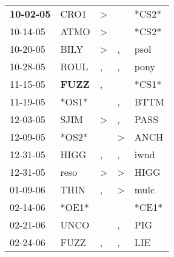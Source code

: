 \begin{supertabular}{p{0.07\textwidth}p{0.06\textwidth}p{0.02\textwidth}p{0.02\textwidth}p{0.06\textwidth}}
 \textbf{10-02-05\textsuperscript{}} &           CRO1\textsuperscript{} &     \textgreater &                  &                            *CS2* \\
          10-14-05\textsuperscript{} &           ATMO\textsuperscript{} &     \textgreater &                  &                            *CS2* \\
          10-20-05\textsuperscript{} &           BILY\textsuperscript{} &     \textgreater &                , &           psol\textsuperscript{} \\
          10-28-05\textsuperscript{} &           ROUL\textsuperscript{} &                , &                , &           pony\textsuperscript{} \\
          11-15-05\textsuperscript{} &  \textbf{FUZZ\textsuperscript{}} &                , &                  &                            *CS1* \\
          11-19-05\textsuperscript{} &                            *OS1* &                  &                , &           BTTM\textsuperscript{} \\
          12-03-05\textsuperscript{} &           SJIM\textsuperscript{} &     \textgreater &                , &           PASS\textsuperscript{} \\
          12-09-05\textsuperscript{} &                            *OS2* &                  &     \textgreater &           ANCH\textsuperscript{} \\
          12-31-05\textsuperscript{} &           HIGG\textsuperscript{} &                , &                , &           iwnd\textsuperscript{} \\
          12-31-05\textsuperscript{} &           reso\textsuperscript{} &     \textgreater &     \textgreater &           HIGG\textsuperscript{} \\
          01-09-06\textsuperscript{} &           THIN\textsuperscript{} &                , &     \textgreater &           mulc\textsuperscript{} \\
          02-14-06\textsuperscript{} &                            *OE1* &                  &                  &                            *CE1* \\
          02-21-06\textsuperscript{} &           UNCO\textsuperscript{} &                  &                , &            PIG\textsuperscript{} \\
          02-24-06\textsuperscript{} &           FUZZ\textsuperscript{} &                , &                , &            LIE\textsuperscript{} \\

\end{supertabular}
